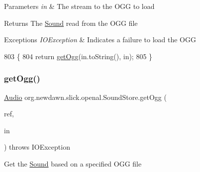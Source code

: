 \begin{DoxyParams}{Parameters}
{\em in} & The stream to the O\+GG to load \\
\hline
\end{DoxyParams}
\begin{DoxyReturn}{Returns}
The \mbox{\hyperlink{classorg_1_1newdawn_1_1slick_1_1_sound}{Sound}} read from the O\+GG file 
\end{DoxyReturn}

\begin{DoxyExceptions}{Exceptions}
{\em I\+O\+Exception} & Indicates a failure to load the O\+GG \\
\hline
\end{DoxyExceptions}

\begin{DoxyCode}
803                                                            \{
804         \textcolor{keywordflow}{return} \mbox{\hyperlink{classorg_1_1newdawn_1_1slick_1_1openal_1_1_sound_store_a75fa2225dccc26b91963964706a18098}{getOgg}}(in.toString(), in);
805     \}
\end{DoxyCode}
\mbox{\label{classorg_1_1newdawn_1_1slick_1_1openal_1_1_sound_store_af221f2a8f9609b20c1559f750da7044c}} 
\subsubsection{\texorpdfstring{get\+Ogg()}{getOgg()}\hspace{0.1cm}{\footnotesize\ttfamily [3/3]}}
{\footnotesize\ttfamily \mbox{\hyperlink{interfaceorg_1_1newdawn_1_1slick_1_1openal_1_1_audio}{Audio}} org.\+newdawn.\+slick.\+openal.\+Sound\+Store.\+get\+Ogg (\begin{DoxyParamCaption}\item[{String}]{ref,  }\item[{Input\+Stream}]{in }\end{DoxyParamCaption}) throws I\+O\+Exception\hspace{0.3cm}{\ttfamily [inline]}}

Get the \mbox{\hyperlink{classorg_1_1newdawn_1_1slick_1_1_sound}{Sound}} based on a specified O\+GG file


